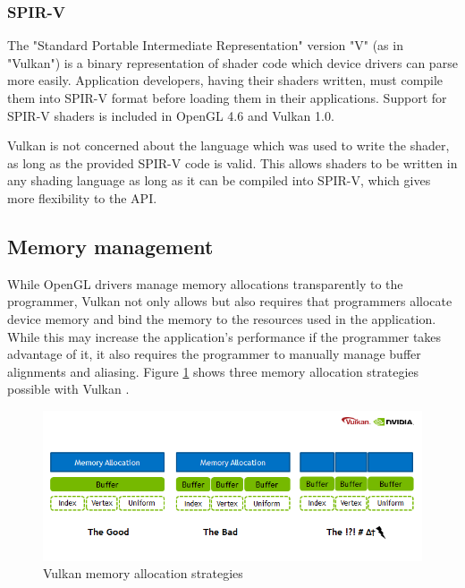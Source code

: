 \subsubsection{SPIR-V}
The "Standard Portable Intermediate Representation" version "V" (as in "Vulkan") is a binary representation of shader code which device drivers can parse more easily. Application developers, having their shaders written, must compile them into SPIR-V format before loading them in their applications. Support for SPIR-V shaders is included in OpenGL 4.6 and Vulkan 1.0.

Vulkan is not concerned about the language which was used to write the shader, as long as the provided SPIR-V code is valid. This allows shaders to be written in any shading language as long as it can be compiled into SPIR-V, which gives more flexibility to the API.

\subsection{Memory management}
While OpenGL drivers manage memory allocations transparently to the programmer, Vulkan not only allows but also requires that programmers allocate device memory and bind the memory to the resources used in the application. While this may increase the application's performance if the programmer takes advantage of it, it also requires the programmer to manually manage buffer alignments and aliasing. Figure \ref{fig:vulkan_mem_alloc} shows three memory allocation strategies possible with Vulkan \cite{vulkan_mem_mgmt}.

\begin{figure}[ht]
    \caption{Vulkan memory allocation strategies}
    \begin{center}
        \includegraphics[width = 15cm]{figs/vulkan_memory_strategy.png}
    \end{center}
    \label{fig:vulkan_mem_alloc}
\end{figure}

